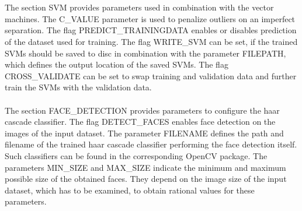 \\
\\
The section SVM provides parameters used in combination with the vector machines. The C\_VALUE parameter is used to penalize outliers on an imperfect separation. The flag PREDICT\_TRAININGDATA enables or disables prediction of the dataset used for training. The flag WRITE\_SVM can be set, if the trained SVMs should be saved to disc in combination with the parameter FILEPATH, which defines the output location of the saved SVMs. The flag CROSS\_VALIDATE can be set to swap training and validation data and further train the SVMs with the validation data.
\\
\\
The section FACE\_DETECTION provides parameters to configure the haar cascade classifier. The flag DETECT\_FACES enables face detection on the images of the input dataset. The parameter FILENAME defines the path and filename of the trained haar cascade classifier performing the face detection itself. Such classifiers can be found in the corresponding OpenCV package. The parameters MIN\_SIZE and MAX\_SIZE indicate the minimum and maximum possible size of the obtained faces. They depend on the image size of the input dataset, which has to be examined, to obtain rational values for these parameters.
